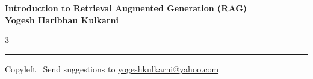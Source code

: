 \documentclass[8pt,landscape]{article}
\begin{document}
\footnotesize


\begin{center}
\Large{\textbf{Introduction to Retrieval Augmented Generation (RAG)\\ Yogesh Haribhau Kulkarni}}  
\end{center}

\begin{multicols}{3}

\end{multicols}

\rule{\linewidth}{0.25pt}
\scriptsize
Copyleft \textcopyleft\  Send suggestions to 
\href{http://www.yogeshkulkarni.com}{yogeshkulkarni@yahoo.com}
\end{document}
